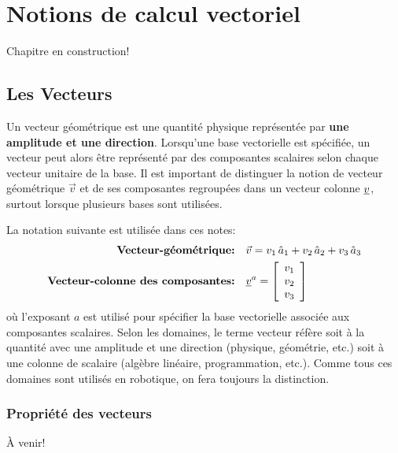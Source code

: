 \chapter{Notions de calcul vectoriel}
\label{sec:calcvec}

Chapitre en construction!

\section{Les Vecteurs}
\label{sec:vec}

Un vecteur géométrique est une quantité physique représentée par \textbf{une amplitude et une direction}. Lorsqu'une base vectorielle est spécifiée, un vecteur peut alors être représenté par des composantes scalaires selon chaque vecteur unitaire de la base. Il est important de distinguer la notion de vecteur géométrique $\vec{v}$ et de ses composantes regroupées dans un vecteur colonne $\underline{v}$, surtout lorsque plusieurs bases sont utilisées.

La notation suivante est utilisée dans ces notes:
\begin{align}
 \text{\textbf{Vecteur-géométrique:}}&\quad
 \vec{v} = v_1 \, \hat{a}_{1} + v_2 \, \hat{a}_{2} + v_3 \, \hat{a}_{3}
 \\
 \text{\textbf{Vecteur-colonne des composantes:}}&\quad
 \underline{v}^{a} = \left[ \begin{array}{c} v_1 \\ v_2 \\ v_3  \end{array} \right]
 \label{eq:veccoldef2}
\end{align}
où l'exposant $a$ est utilisé pour spécifier la base vectorielle associée aux composantes scalaires. Selon les domaines, le terme vecteur réfère soit à la quantité avec une amplitude et une direction (physique, géométrie, etc.) soit à une colonne de scalaire (algèbre linéaire, programmation, etc.). Comme tous ces domaines sont utilisés en robotique, on fera toujours la distinction.


\subsection{Propriété des vecteurs}

À venir!


\newpage
